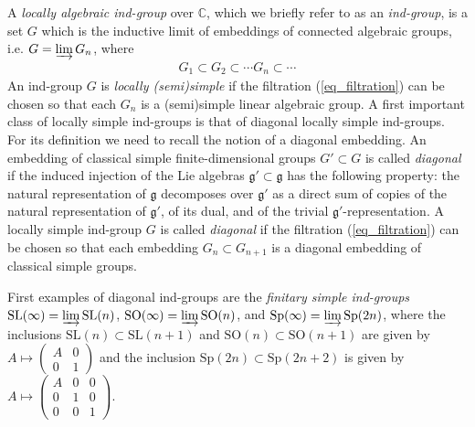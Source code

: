 \documentclass[12pt]{article}
\newcommand{\SL} {\mathrm{SL}}
\newcommand{\SO} {\mathrm{SO}}
\newcommand{\Sp} {\mathrm{Sp}}
\def\CC {{\mathbb C}}     %
\def \g {\mathfrak{g}}
\begin{document}
A \textit{locally algebraic ind-group} over $\CC$, which we briefly refer to as an \textit{ind-group}, is a set $G$ which is the inductive limit of embeddings of connected algebraic groups, i.e. $G = \varinjlim G_n$, where
\begin{align} \label{eq_filtration}
G_1 \subset G_2 \subset \cdots G_n \subset \cdots
\end{align}
An ind-group $G$ is \textit{locally (semi)simple} %
if the filtration (\ref{eq_filtration}) can be chosen so that each $G_n$ is a (semi)simple %
linear algebraic group. A first important class of locally simple ind-groups is that of diagonal locally simple ind-groups. For its definition we need to recall the notion of a diagonal embedding. An embedding of classical simple finite-dimensional groups $G' \subset G$ is called \textit{diagonal} if the induced injection of the Lie algebras $\g' \subset \g$ has the following property: the natural representation of $\g$ decomposes over $\g'$ as a direct sum of copies of the natural representation of $\g'$, of its dual, and of the trivial $\g'$-representation. A locally simple ind-group $G$ is called \textit{diagonal} if the filtration (\ref{eq_filtration}) can be chosen so that each embedding $G_n \subset G_{n+1}$ is a diagonal embedding of classical simple groups. %

First examples of diagonal ind-groups are the \textit{finitary simple ind-groups} $\SL(\infty) = \varinjlim \SL(n)$, $\SO(\infty) = \varinjlim \SO(n)$, and $\Sp(\infty) = \varinjlim \Sp(2n)$, where the inclusions $\SL(n) \subset \SL(n+1)$ and $\SO(n)\subset \SO(n+1)$ are given by $A \mapsto \left (\begin{smallmatrix} A & 0\\ 0 & 1\end{smallmatrix}  \right ) $ and the inclusion $\Sp(2n)\subset \Sp(2n+2)$ is given by $A \mapsto \left (\begin{smallmatrix} A & 0 & 0\\ 0 & 1 & 0 \\ 0 & 0 & 1\end{smallmatrix}\right )$.
 
\end{document}
